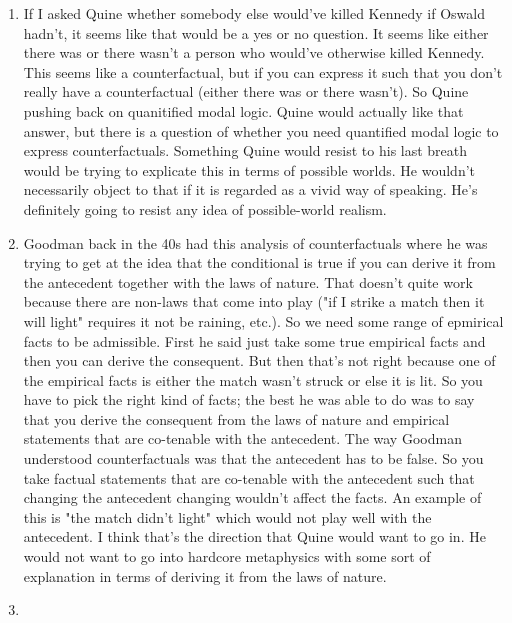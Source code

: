 \documentclass[12pt]{article}
\theoremstyle{definition}
\begin{document}
\begin{enumerate}
    \itemsep0em 
    \item
        If I asked Quine whether somebody else would've killed Kennedy if
        Oswald hadn't, it seems like that would be a yes or no question. It
        seems like either there was or there wasn't a person who would've
        otherwise killed Kennedy. This seems like a counterfactual, but if you
        can express it such that you don't really have a counterfactual (either
        there was or there wasn't). So Quine pushing back on quanitified modal
        logic. Quine would actually like that answer, but there is a question
        of whether you need quantified modal logic to express counterfactuals.
        Something Quine would resist to his last breath would be trying to
        explicate this in terms of possible worlds. He wouldn't necessarily
        object to that if it is regarded as a vivid way of speaking. He's
        definitely going to resist any idea of possible-world realism.
    \item
        Goodman back in the 40s had this analysis of counterfactuals where he
        was trying to get at the idea that the conditional is true if you can
        derive it from the antecedent together with the laws of nature. That
        doesn't quite work because there are non-laws that come into play ("if
        I strike a match then it will light" requires it not be raining, etc.).
        So we need some range of epmirical facts to be admissible. First he
        said just take some true empirical facts and then you can derive the
        consequent. But then that's not right because one of the empirical
        facts is either the match wasn't struck or else it is lit. So you have
        to pick the right kind of facts; the best he was able to do was to say
        that you derive the consequent from the laws of nature and empirical
        statements that are co-tenable with the antecedent. The way Goodman
        understood counterfactuals was that the antecedent has to be false. So
        you take factual statements that are co-tenable with the antecedent
        such that changing the antecedent changing wouldn't affect the facts.
        An example of this is "the match didn't light" which would not play
        well with the antecedent. I think that's the direction that Quine would
        want to go in. He would not want to go into hardcore metaphysics with
        some sort of explanation in terms of deriving it from the laws of
        nature. 
    \item

\end{enumerate}
\end{document}
